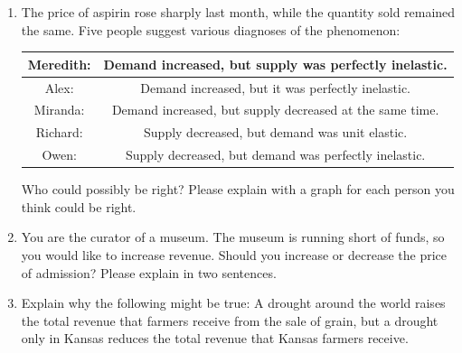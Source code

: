 \documentclass{article}
\begin{document}
\begin{enumerate}
	\begin{enumerate}
	
	\item What happens to the price of coffee beans?
	
	\item What happens to the price of a cup of coffee?
	
	\item What happens to total expenditure on cups of coffee?
	
	\end{enumerate}

\item The price of aspirin rose sharply last month, while the quantity sold remained the same. Five people suggest various diagnoses of the phenomenon:

	\begin{tabular}{| c | c |}
	\hline
	Meredith: & Demand increased, but supply was perfectly inelastic. \\
	\hline
	Alex: & Demand increased, but it was perfectly inelastic. \\
	\hline
	Miranda: & Demand increased, but supply decreased at the same time. \\
	\hline
	Richard: & Supply decreased, but demand was unit elastic. \\
	\hline
	Owen: & Supply decreased, but demand was perfectly inelastic. \\
	\hline
	\end{tabular}
	
	Who could possibly be right? Please explain with a graph for each person you think could be right.
	
\item You are the curator of a museum. The museum is running short of funds, so you would like to increase revenue. Should you increase or decrease the price of admission? Please explain in two sentences.

\item Explain why the following might be true: A drought around the world raises the total revenue that farmers receive from the sale of grain, but a drought only in Kansas reduces the total revenue that Kansas farmers receive.

\end{enumerate}
\end{document}
